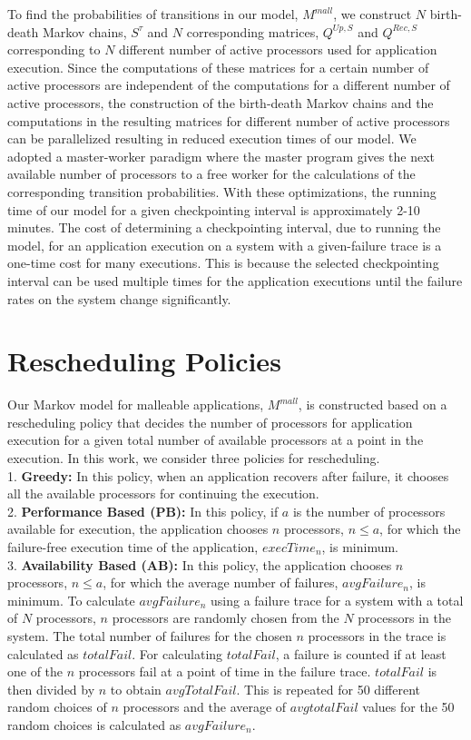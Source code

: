 \documentclass[conference,10pt]{IEEEtran}
\begin{document}
To find the probabilities of transitions in our model, $M^{mall}$, we
construct $N$ birth-death Markov chains, $S^{\tau}$ and $N$
corresponding matrices, $Q^{Up,S}$ and $Q^{Rec,S}$ corresponding to
$N$ different number of active processors used for application execution. Since the
computations of these matrices for a certain number of active
processors are independent of the computations for a
different number of active processors, the construction of the
birth-death Markov chains and the computations in the resulting
matrices for different number of active processors can be parallelized
resulting in reduced execution times of our model. We adopted a
master-worker paradigm where the master program gives the next
available number of processors to a free worker for the calculations
of the corresponding transition probabilities. With these
optimizations, the running time of our model for a given checkpointing
interval is approximately 2-10 minutes. The cost of determining a
checkpointing interval, due to running the model, for an application
execution on a system with a given-failure trace is a one-time cost
for many executions. This is because the selected checkpointing
interval can be used multiple times for the application executions
until the failure rates on the system change significantly.

\section{Rescheduling Policies}
\label{rescheduling}

Our Markov model for malleable applications, $M^{mall}$, is
constructed based on a rescheduling policy that decides the number of
processors for application execution for a given total number of
available processors at a point in the execution. In
this work, we consider three policies for rescheduling. \\
1. {\bf Greedy:} In this policy, when an application recovers after
  failure, it chooses all the available processors for continuing the
  execution. \\
2. {\bf Performance Based (PB):} In this policy, if $a$ is the
  number of processors available for execution, the application
  chooses $n$ processors, $n\leq a$, for which the
  failure-free execution time of the application, $execTime_n$, is
  minimum. \\
3. {\bf Availability Based (AB):} In this policy, the application
  chooses $n$ processors, $n\leq a$, for which the average number of
  failures, $avgFailure_n$, is minimum. To calculate $avgFailure_{n}$
  using a failure trace for a system with a total of $N$ processors,
  $n$ processors are randomly chosen from the $N$ processors in the
  system. The total number of failures for the chosen $n$ processors
  in the trace is calculated as $totalFail$. For calculating
  $totalFail$, a failure is counted if at least one of the $n$
  processors fail at a point of time in the failure trace. $totalFail$
  is then divided by $n$ to obtain $avgTotalFail$. This is repeated
  for 50 different random choices of $n$ processors and the average of
  $avgtotalFail$ values for the 50 random choices is calculated as
  $avgFailure_{n}$.
\end{document}
